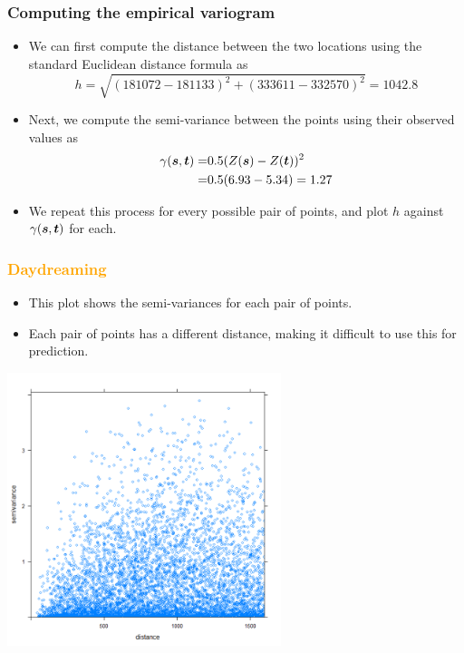 \documentclass[parskip,12pt]{beamer}
\newcommand{\bd}[1]{\ensuremath{\mbox{\boldmath $#1$}}}
\begin{document}
\begin{frame}
\frametitle{Computing the empirical variogram}
 \begin{itemize}
\item We can first compute the distance between the two locations using the standard Euclidean distance formula as \small{$$h = \sqrt{(181072-181133)^2 + (333611-332570)^2} = 1042.8$$}
\vspace{-2mm}
\item Next, we compute the semi-variance between the points using their observed values as
\begin{align*}
\gamma(\bd{s}, \bd{t}) =& 0.5(Z(\bd{s}) - Z(\bd{t}))^2\\
=& 0.5(6.93 - 5.34) = 1.27
\end{align*}
\vspace{-2mm}
\item We repeat this process for every possible pair of points, and plot $h$ against $\gamma(\bd{s}, \bd{t})$ for each.
\end{itemize}
\end{frame}

\begin{frame}
\frametitle{\textcolor{orange}{Daydreaming}}
\vspace{2mm}
 \begin{itemize}
\item This plot shows the semi-variances for each pair of points.
\vspace{2mm}
\item Each pair of points has a different distance, making it difficult to use this for prediction.
\vspace{-2mm}
\end{itemize}
    \begin{center}
     \includegraphics[width=0.6\textwidth]{MeuseVariogram}
          \end{center}
\end{frame}
\end{document}
